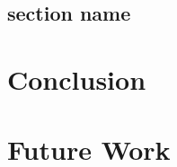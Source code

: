 \documentclass[a4paper,11pt,titlepage]{report}
\begin{document}
\section{section name}


\newpage
\chapter{Conclusion}

\newpage
\chapter{Future Work}

\newpage
{}

\printbibliography
\end{document}
